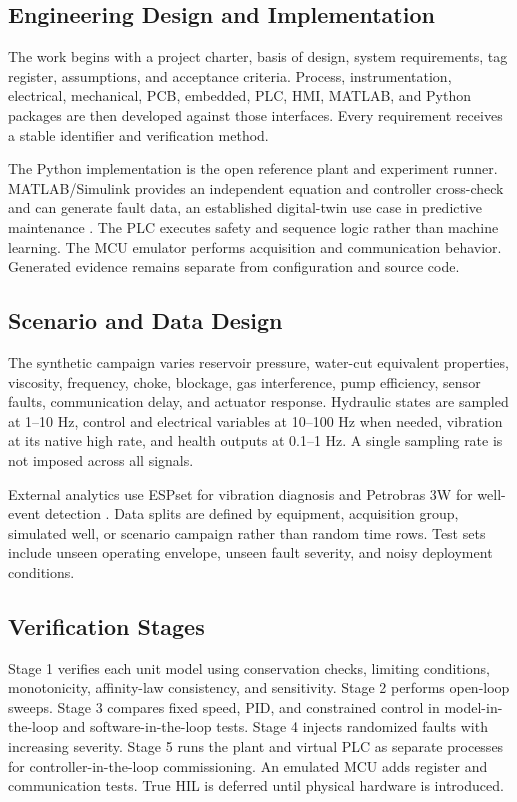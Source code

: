 \documentclass[conference]{IEEEtran}
\begin{document}
\subsection{Engineering Design and Implementation}
The work begins with a project charter, basis of design, system requirements, tag register, assumptions, and acceptance criteria. Process, instrumentation, electrical, mechanical, PCB, embedded, PLC, HMI, MATLAB, and Python packages are then developed against those interfaces. Every requirement receives a stable identifier and verification method.

The Python implementation is the open reference plant and experiment runner. MATLAB/Simulink provides an independent equation and controller cross-check and can generate fault data, an established digital-twin use case in predictive maintenance \cite{mathworks-pump}. The PLC executes safety and sequence logic rather than machine learning. The MCU emulator performs acquisition and communication behavior. Generated evidence remains separate from configuration and source code.

\subsection{Scenario and Data Design}
The synthetic campaign varies reservoir pressure, water-cut equivalent properties, viscosity, frequency, choke, blockage, gas interference, pump efficiency, sensor faults, communication delay, and actuator response. Hydraulic states are sampled at 1--10 Hz, control and electrical variables at 10--100 Hz when needed, vibration at its native high rate, and health outputs at 0.1--1 Hz. A single sampling rate is not imposed across all signals.

External analytics use ESPset for vibration diagnosis and Petrobras 3W for well-event detection \cite{varejao2024,vargas2026}. Data splits are defined by equipment, acquisition group, simulated well, or scenario campaign rather than random time rows. Test sets include unseen operating envelope, unseen fault severity, and noisy deployment conditions.

\subsection{Verification Stages}
Stage 1 verifies each unit model using conservation checks, limiting conditions, monotonicity, affinity-law consistency, and sensitivity. Stage 2 performs open-loop sweeps. Stage 3 compares fixed speed, PID, and constrained control in model-in-the-loop and software-in-the-loop tests. Stage 4 injects randomized faults with increasing severity. Stage 5 runs the plant and virtual PLC as separate processes for controller-in-the-loop commissioning. An emulated MCU adds register and communication tests. True HIL is deferred until physical hardware is introduced.
\end{document}
